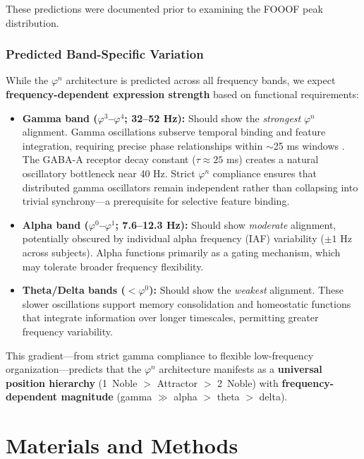 \documentclass[11pt,a4paper]{article}
\newcommand{\phisym}{\varphi}
\begin{document}
These predictions were documented prior to examining the FOOOF peak distribution.

\subsubsection{Predicted Band-Specific Variation}
\label{sec:band_prediction}

While the $\phisym^n$ architecture is predicted across all frequency bands, we expect \textbf{frequency-dependent expression strength} based on functional requirements:

\begin{itemize}
    \item \textbf{Gamma band ($\phisym^3$--$\phisym^4$; 32--52 Hz):} Should show the \textit{strongest} $\phisym^n$ alignment. Gamma oscillations subserve temporal binding and feature integration, requiring precise phase relationships within $\sim$25 ms windows \citep{gray1989}. The GABA-A receptor decay constant ($\tau \approx 25$ ms) creates a natural oscillatory bottleneck near 40 Hz. Strict $\phisym^n$ compliance ensures that distributed gamma oscillators remain independent rather than collapsing into trivial synchrony---a prerequisite for selective feature binding.

    \item \textbf{Alpha band ($\phisym^0$--$\phisym^1$; 7.6--12.3 Hz):} Should show \textit{moderate} alignment, potentially obscured by individual alpha frequency (IAF) variability ($\pm 1$ Hz across subjects). Alpha functions primarily as a gating mechanism, which may tolerate broader frequency flexibility.

    \item \textbf{Theta/Delta bands ($<\phisym^0$):} Should show the \textit{weakest} alignment. These slower oscillations support memory consolidation and homeostatic functions that integrate information over longer timescales, permitting greater frequency variability.
\end{itemize}

This gradient---from strict gamma compliance to flexible low-frequency organization---predicts that the $\phisym^n$ architecture manifests as a \textbf{universal position hierarchy} (1\degree\ Noble $>$ Attractor $>$ 2\degree\ Noble) with \textbf{frequency-dependent magnitude} (gamma $\gg$ alpha $>$ theta $>$ delta).

\section{Materials and Methods}
\end{document}
